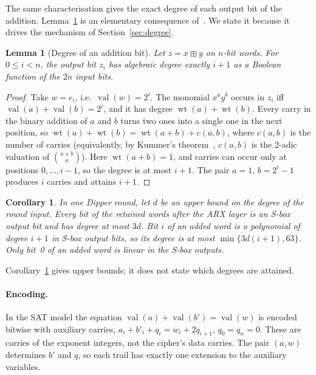 \documentclass[pdflatex,sn-mathphys-num]{sn-jnl}
\theoremstyle{thmstyleone}
\newtheorem{lemma}{Lemma}
\newtheorem{corollary}{Corollary}
\theoremstyle{thmstylethree}
\theoremstyle{thmstyletwo}
\newcommand{\modadd}{\boxplus}
\newcommand{\intval}{\operatorname{val}}
\newcommand{\hw}{\operatorname{wt}}
\begin{document}
The same characterisation gives the exact degree of each output bit of the addition. Lemma~\ref{lem:deg} is an elementary consequence of~\cite{braeken2005}. We state it because it drives the mechanism of Section~\ref{sec:degree}.

\begin{lemma}[Degree of an addition bit]\label{lem:deg}
Let $z=x\modadd y$ on $n$-bit words. For $0\le i<n$, the output bit $z_i$ has algebraic degree exactly $i+1$ as a Boolean function of the $2n$ input bits.
\end{lemma}
\begin{proof}
Take $w=e_i$, i.e.\ $\intval(w)=2^i$. The monomial $x^ay^b$ occurs in $z_i$ iff $\intval(a)+\intval(b)=2^i$, and it has degree $\hw(a)+\hw(b)$. Every carry in the binary addition of $a$ and $b$ turns two ones into a single one in the next position, so $\hw(a)+\hw(b)=\hw(a+b)+c(a,b)$, where $c(a,b)$ is the number of carries (equivalently, by Kummer's theorem~\cite{kummer1852}, $c(a,b)$ is the 2-adic valuation of $\binom{a+b}{a}$). Here $\hw(a+b)=1$, and carries can occur only at positions $0,\dots,i-1$, so the degree is at most $i+1$. The pair $a=1$, $b=2^i-1$ produces $i$ carries and attains $i+1$.
\end{proof}

\begin{corollary}\label{cor:round}
In one Dipper round, let $d$ be an upper bound on the degree of the round input. Every bit of the retained words after the ARX layer is an S-box output bit and has degree at most $3d$. Bit $i$ of an added word is a polynomial of degree $i+1$ in S-box output bits, so its degree is at most $\min\{3d(i+1),63\}$. Only bit~0 of an added word is linear in the S-box outputs.
\end{corollary}
Corollary~\ref{cor:round} gives upper bounds; it does not state which degrees are attained.

\paragraph{Encoding.} In the SAT model the equation $\intval(a)+\intval(b')=\intval(w)$ is encoded bitwise with auxiliary carries, $a_i+b'_i+q_i=w_i+2q_{i+1}$, $q_0=q_n=0$. These are carries of the exponent integers, not the cipher's data carries. The pair $(a,w)$ determines $b'$ and $q$, so each trail has exactly one extension to the auxiliary variables.
\end{document}
